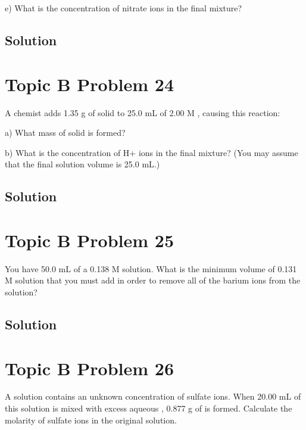 \documentclass[10pt]{article}
\begin{document}
        e) What is the concentration of nitrate ions in the final mixture?

        \subsection{Solution}

    \pagebreak
    \section{Topic B Problem 24}
        A chemist adds 1.35 g of solid  to 25.0 mL of 2.00 M , causing this reaction:
        \begin{center}
        \end{center}
        
        a) What mass of solid  is formed?
        
        b) What is the concentration of H+ ions in the final mixture? 
        (You may assume that the final solution volume is 25.0 mL.)

        \subsection{Solution}

    \pagebreak
    \section{Topic B Problem 25}
        You have 50.0 mL of a 0.138 M  solution. 
        What is the minimum volume of 0.131 M  solution that you must add in order to remove all of the barium ions from the solution?

        \subsection{Solution}

    \pagebreak
    \section{Topic B Problem 26}
        A solution contains an unknown concentration of sulfate ions. When 20.00 mL of this solution is mixed with excess aqueous , 0.877 g of  is formed. 
        Calculate the molarity of sulfate ions in the original solution.
\end{document}
